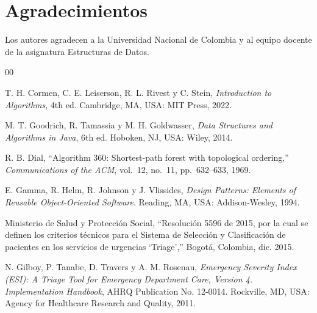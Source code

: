 \documentclass[conference]{IEEEtran}
\begin{document}

\section*{Agradecimientos}

Los autores agradecen a la Universidad Nacional de Colombia y al equipo
docente de la asignatura Estructuras de Datos.


\begin{thebibliography}{00}

T. H. Cormen, C. E. Leiserson, R. L. Rivest y C. Stein,
\textit{Introduction to Algorithms}, 4th ed.
Cambridge, MA, USA: MIT Press, 2022.

M. T. Goodrich, R. Tamassia y M. H. Goldwasser,
\textit{Data Structures and Algorithms in Java}, 6th ed.
Hoboken, NJ, USA: Wiley, 2014.

R. B. Dial, ``Algorithm 360: Shortest-path forest with topological
ordering,'' \textit{Communications of the ACM}, vol.~12, no.~11,
pp.~632--633, 1969.

E. Gamma, R. Helm, R. Johnson y J. Vlissides,
\textit{Design Patterns: Elements of Reusable Object-Oriented Software}.
Reading, MA, USA: Addison-Wesley, 1994.

Ministerio de Salud y Protección Social, ``Resolución 5596 de 2015, por la
cual se definen los criterios técnicos para el Sistema de Selección y
Clasificación de pacientes en los servicios de urgencias `Triage','' Bogotá,
Colombia, dic. 2015.

N. Gilboy, P. Tanabe, D. Travers y A. M. Rosenau,
\textit{Emergency Severity Index (ESI): A Triage Tool for Emergency
Department Care, Version 4. Implementation Handbook}, AHRQ Publication
No. 12-0014. Rockville, MD, USA: Agency for Healthcare Research and
Quality, 2011.

\end{thebibliography}
\end{document}
